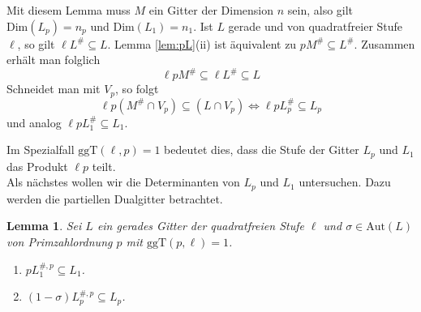 \documentclass[12pt,a4paper,halfparskip,headsepline,bibtotocnumbered]{scrreprt}
\theoremstyle{nummermitklammern}
\newtheorem{lemma}[defsatzusw]{Lemma}
\theoremstyle{nonumberbreak}
\newcommand{\ggT}{\text{ggT}}
\newcommand{\Aut}{\text{Aut}}
\begin{document}
Mit diesem Lemma muss $M$ ein Gitter der Dimension $n$ sein, also gilt $\text{Dim}(L_p) = n_p$ und $\text{Dim}(L_1) = n_1$. Ist $L$ gerade und von quadratfreier Stufe $\ell$, so gilt $\ell L^\# \subseteq L$. Lemma \eqref{lem:pL}(ii) ist äquivalent zu $p M^\# \subseteq L^\#$. Zusammen erhält man folglich
\begin{equation*}
	\ell p M^\# \subseteq \ell L^\# \subseteq L
\end{equation*}
Schneidet man mit $V_p$, so folgt
\begin{equation*}
	\ell p (M^\# \cap V_p) \subseteq (L \cap V_p) \Leftrightarrow \ell p L_p^\# \subseteq L_p
\end{equation*}
und analog $\ell p L_1^\# \subseteq L_1$.

Im Spezialfall $\ggT(\ell, p) = 1$ bedeutet dies, dass die Stufe der Gitter $L_p$ und $L_1$ das Produkt $\ell p$ teilt.\\
Als nächstes wollen wir die Determinanten von $L_p$ und $L_1$ untersuchen. Dazu werden die partiellen Dualgitter betrachtet.

\begin{framed}
	\begin{lemma}\label{lem:fpinc}
		Sei $L$ ein gerades Gitter der quadratfreien Stufe $\ell$ und $\sigma \in \Aut(L)$ von Primzahlordnung $p$ mit $\ggT(p, \ell) = 1$.
		\begin{enumerate}[label=(\roman*)]
			\item $p L_1^{\#,p} \subseteq L_1$.
			\item $(1 - \sigma)L_p^{\#,p} \subseteq L_p$.
		\end{enumerate}
	\end{lemma}
\end{framed}
\end{document}
